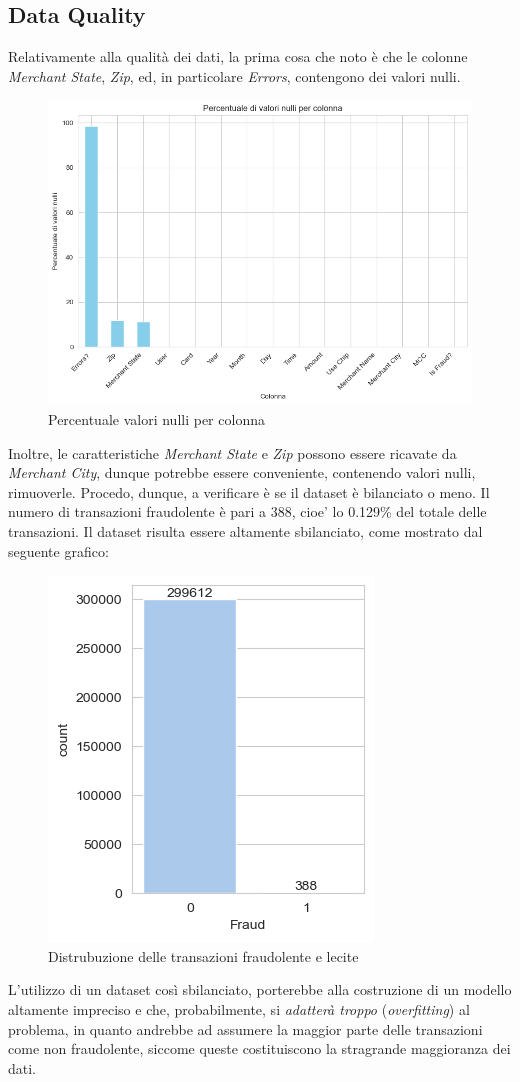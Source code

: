 \documentclass[]{article}
\begin{document}
    \subsection{Data Quality}
        Relativamente alla qualità dei dati, la prima cosa che noto è che le colonne \textit{Merchant State}, \textit{Zip}, ed, in particolare \textit{Errors}, contengono dei valori nulli.
        \begin{figure}[H]
            \centering
            \includegraphics[width=.6\textwidth]{img/NullValuesPercentage.png}
            \caption[short]{Percentuale valori nulli per colonna}
        \end{figure}
        Inoltre, le caratteristiche \textit{Merchant State} e \textit{Zip} possono essere ricavate da \textit{Merchant City}, dunque potrebbe essere conveniente, contenendo valori nulli, rimuoverle.
        Procedo, dunque, a verificare è se il dataset è bilanciato o meno. Il numero di transazioni fraudolente è pari a 388, cioe' lo 0.129\% del totale delle transazioni. Il dataset risulta essere altamente sbilanciato, come mostrato dal seguente grafico:
        \begin{figure}[H]
            \centering
            \includegraphics[width=.4\textwidth]{img/DistribuzioneFraudVsGen2.png}
            \caption[short]{Distrubuzione delle transazioni fraudolente e lecite}
        \end{figure}
        L’utilizzo di un dataset così sbilanciato, porterebbe alla costruzione di un modello altamente impreciso e che, probabilmente, si \textit{adatterà troppo} (\textit{overfitting}) al problema, in quanto andrebbe ad assumere la maggior parte delle transazioni come non fraudolente, siccome queste costituiscono la stragrande maggioranza dei dati.
\end{document}
